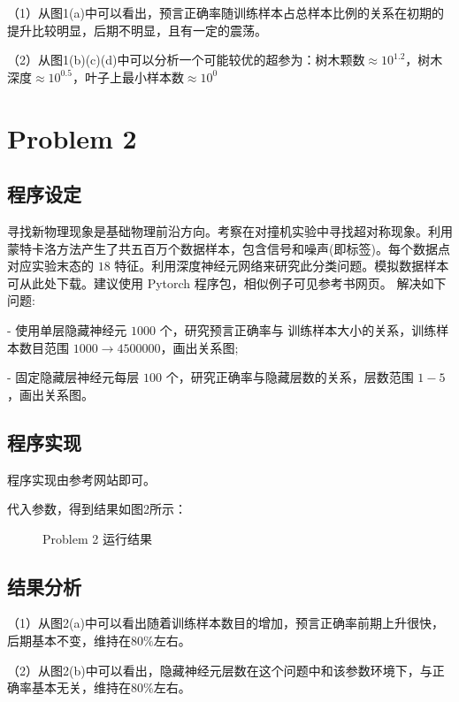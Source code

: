 \documentclass{article}
\begin{document}
（1）从图1(a)中可以看出，预言正确率随训练样本占总样本比例的关系在初期的提升比较明显，后期不明显，且有一定的震荡。

（2）从图1(b)(c)(d)中可以分析一个可能较优的超参为：树木颗数$\approx 10^{1.2}$，树木深度$\approx 10^{0.5}$，叶子上最小样本数$\approx 10^{0}$


\section{Problem 2}
\subsection{程序设定}
寻找新物理现象是基础物理前沿方向。考察在对撞机实验中寻找超对称现象。利用蒙特卡洛方法产生了共五百万个数据样本，包含信号和噪声(即标签)。每个数据点对应实验末态的 $18$ 特征。利用深度神经元网络来研究此分类问题。模拟数据样本可从此处下载。建议使用 Pytorch 程序包，相似例子可见参考书网页。
解决如下问题:
   
- 使用单层隐藏神经元 $1000$ 个，研究预言正确率与 训练样本大小的关系，训练样本数目范围 $1000 \rightarrow 4500000$，画出关系图;

- 固定隐藏层神经元每层 $100$ 个，研究正确率与隐藏层数的关系，层数范围 $1-5$，画出关系图。
\subsection{程序实现}

程序实现由参考网站即可。

代入参数，得到结果如图2所示：

\begin{figure}[t]
 \caption{Problem 2 运行结果}
\end{figure}

\subsection{结果分析}

（1）从图2(a)中可以看出随着训练样本数目的增加，预言正确率前期上升很快，后期基本不变，维持在$80\%$左右。

（2）从图2(b)中可以看出，隐藏神经元层数在这个问题中和该参数环境下，与正确率基本无关，维持在$80\%$左右。
\end{document}
